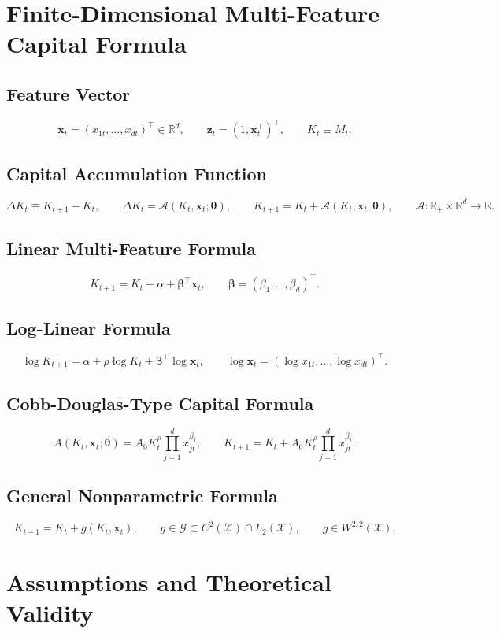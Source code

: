 \documentclass[11pt]{article}
\begin{document}
\section{Finite-Dimensional Multi-Feature Capital Formula}

\subsection{Feature Vector}
\[
\bm{x}_t=(x_{1t},\dots,x_{dt})^\top\in\mathbb{R}^d,
\qquad \bm{z}_t=(1,\bm{x}_t^\top)^\top,
\qquad K_t\equiv M_t.
\]

\subsection{Capital Accumulation Function}
\[
\Delta K_t\equiv K_{t+1}-K_t,
\qquad \Delta K_t=\mathcal{A}(K_t,\bm{x}_t;\bm{\theta}),
\qquad K_{t+1}=K_t+\mathcal{A}(K_t,\bm{x}_t;\bm{\theta}),
\qquad \mathcal{A}:\mathbb{R}_+\times\mathbb{R}^d\to\mathbb{R}.
\]

\subsection{Linear Multi-Feature Formula}
\[
K_{t+1}=K_t+\alpha+\bm{\beta}^\top\bm{x}_t,
\qquad \bm{\beta}=(\beta_1,\ldots,\beta_d)^\top.
\]

\subsection{Log-Linear Formula}
\[
\log K_{t+1}=\alpha+\rho\log K_t+\bm{\beta}^\top\log\bm{x}_t,
\qquad \log\bm{x}_t=(\log x_{1t},\dots,\log x_{dt})^\top.
\]

\subsection{Cobb-Douglas-Type Capital Formula}
\[
A(K_t,\bm{x}_t;\bm{\theta})=A_0 K_t^{\rho}\prod_{j=1}^{d} x_{jt}^{\beta_j},
\qquad K_{t+1}=K_t+A_0 K_t^{\rho}\prod_{j=1}^{d} x_{jt}^{\beta_j}.
\]

\subsection{General Nonparametric Formula}
\[
K_{t+1}=K_t+g(K_t,\bm{x}_t),
\qquad g\in\mathcal{G}\subset C^2(\mathcal{X})\cap L_2(\mathcal{X}),
\qquad g\in W^{2,2}(\mathcal{X}).
\]

\section{Assumptions and Theoretical Validity}
\end{document}
